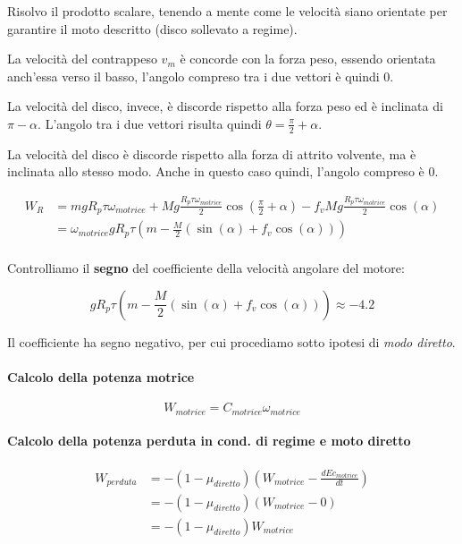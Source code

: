\documentclass[main.tex]{subfiles}
\begin{document}
Risolvo il prodotto scalare, tenendo a mente come le velocità siano orientate per garantire il moto descritto (disco sollevato a regime).

La velocità del contrappeso $v_m$ è concorde con la forza peso, essendo orientata anch'essa verso il basso, l'angolo compreso tra i due vettori è quindi 0.

La velocità del disco, invece, è discorde rispetto alla forza peso ed è inclinata di $\pi - \alpha$. L'angolo tra i due vettori risulta quindi $\theta = \frac{\pi}{2}+\alpha$.

La velocità del disco è discorde rispetto alla forza di attrito volvente, ma è inclinata allo stesso modo. Anche in questo caso quindi, l'angolo compreso è 0.

\begin{align*}
  W_R &= mgR_p\tau\omega_{motrice} + Mg\frac{R_p\tau\omega_{motrice}}{2}\cos\!\left(\frac{\pi}{2} + \alpha\right) - f_vMg\frac{R_p\tau\omega_{motrice}}{2}\cos(\alpha)\\
  &= \omega_{motrice}gR_p\tau(m -\frac{M}{2}(\sin(\alpha) + f_v\cos(\alpha)))\\
\end{align*}

Controlliamo il \textbf{segno} del coefficiente della velocità angolare del motore:

\[
  gR_p\tau(m -\frac{M}{2}(\sin(\alpha) + f_v\cos(\alpha))) \approx -4.2
\]

Il coefficiente ha segno negativo, per cui procediamo sotto ipotesi di \textit{modo diretto}.

\paragraph{Calcolo della potenza motrice}

\[
  W_{motrice} = C_{motrice}\omega_{motrice}
\]

\paragraph{Calcolo della potenza perduta in cond. di regime e moto diretto}

\begin{align*}
  W_{perduta} &= -(1 - \mu_{diretto})(W_{motrice} - \frac{dEc_{motrice}}{dt}) \\
             &= -(1 - \mu_{diretto})(W_{motrice} - 0) \\
             &= -(1 - \mu_{diretto})W_{motrice}
\end{align*}
\end{document}
